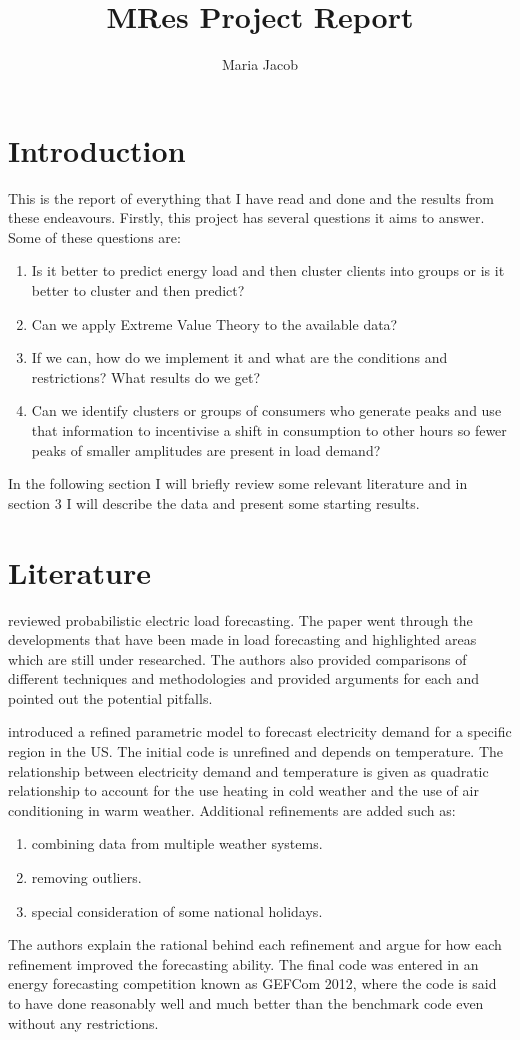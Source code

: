 \documentclass[a4paper]{article}
\title{MRes Project Report}
\author{Maria Jacob}
\begin{document}
\maketitle
\section{Introduction}

This is the report of everything that I have read and done and the results from these endeavours.
Firstly, this project has several questions it aims to answer. Some of these questions are:
\begin{enumerate}
\item Is it better to predict energy load and then cluster clients into groups or is it better to cluster and then predict?
\item Can we apply Extreme Value Theory to the available data?
\item If we can, how do we implement it and what are the conditions and restrictions? What results do we get?
\item Can we identify clusters or groups of consumers who generate peaks and use that information to incentivise a shift in consumption to other hours so fewer peaks of smaller amplitudes are present in load demand?
\end{enumerate}

In the following section I will briefly review some relevant literature and in section 3 I will describe the data and present some starting results.

\section{Literature}

\cite{hong16} reviewed probabilistic electric load forecasting. The paper went through the developments that have been made in load forecasting and highlighted areas which are still under researched. The authors also provided comparisons of different techniques and methodologies and provided arguments for each and pointed out the potential pitfalls.

\cite{Char14} introduced a refined parametric model to forecast electricity demand for a specific region in the US. The initial code is unrefined and depends on temperature. The relationship between electricity demand and temperature is given as quadratic relationship to account for the use heating in cold weather and the use of air conditioning in warm weather. Additional refinements are added such as:
\begin{enumerate}
\item combining data from multiple weather systems.
\item removing outliers.
\item special consideration of some national holidays.
\end{enumerate}
The authors explain the rational behind each refinement and argue for how each refinement improved the forecasting ability. The final code was entered in an energy forecasting competition known as GEFCom 2012, where the code is said to have done reasonably well and much better than the benchmark code even without any restrictions.
\end{document}
